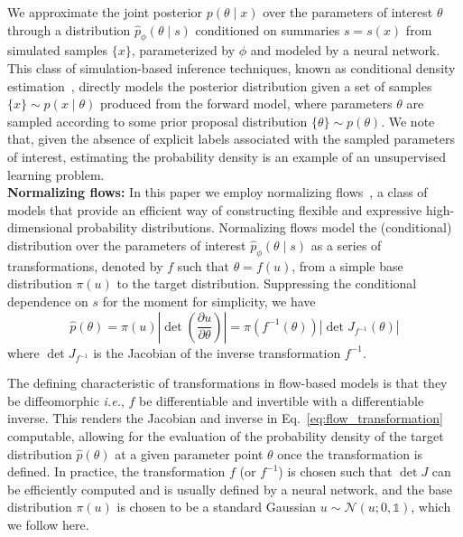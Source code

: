 \documentclass[prd,aps,10pt,nofootinbib,twocolumn,superscriptaddress,preprintnumbers,balancelastpage,longbibliography,floatfix]{revtex4-2}
\begin{document}
We approximate the joint posterior $p(\theta\mid x)$ over the parameters of interest $\theta$ through a distribution $\hat p_\phi(\theta\mid s)$ conditioned on summaries $s=s(x)$ from simulated samples $\{x\}$, parameterized by $\phi$ and modeled by a neural network. This class of simulation-based inference techniques, known as conditional density estimation~\cite{10.5555/3157096.3157212,cranmer_kyle_2016_198541}, directly models the posterior distribution given a set of samples $\{x\}\sim p(x\mid\theta)$ produced from the forward model, where parameters $\theta$ are sampled according to some prior proposal distribution $\{\theta\}\sim p(\theta)$. We note that, given the absence of explicit labels associated with the sampled parameters of interest, estimating the probability density is an example of an unsupervised learning problem. \\

\noindent
\textbf{Normalizing flows:}
In this paper we employ normalizing flows~\cite{papamakarios2019normalizing,DBLP:conf/icml/RezendeM15}, a class of models that provide an efficient way of constructing flexible and expressive high-dimensional probability distributions. Normalizing flows model the (conditional) distribution over the parameters of interest $\hat p_\phi(\theta\mid s)$ as a series of transformations, denoted by $f$ such that $\theta = f(u)$, from a simple base distribution $\pi({u})$ to the target distribution. Suppressing the conditional dependence on $s$ for the moment for simplicity, we have
\begin{equation}
\label{eq:flow_transformation}
\hat{p}({\theta})=\pi(u)\left|\operatorname{det}\left(\frac{\partial u}{\partial {\theta}}\right)\right|=\pi(f^{-1}({\theta}))\left|\operatorname{det}J_{f^{-1}}(\theta)\right|
\end{equation}
where $\operatorname{det}J_{f^{-1}}$ is the Jacobian of the inverse transformation $f^{-1}$.

The defining characteristic of transformations in flow-based models is that they be diffeomorphic \emph{i.e.}, $f$ be differentiable and invertible with a differentiable inverse. This renders the Jacobian and inverse in Eq.~\eqref{eq:flow_transformation} computable, allowing for the evaluation of the probability density of the target distribution $\hat{p}({\theta})$ at a given parameter point $\theta$ once the transformation is defined. In practice, the transformation $f$ (or $f^{-1}$) is chosen such that $\operatorname{det}J$ can be efficiently computed and is usually defined by a neural network, and the base distribution $\pi(u)$ is chosen to be a standard Gaussian $u\sim \mathcal N(u; 0, \mathbb{1})$, which we follow here. 
\end{document}

